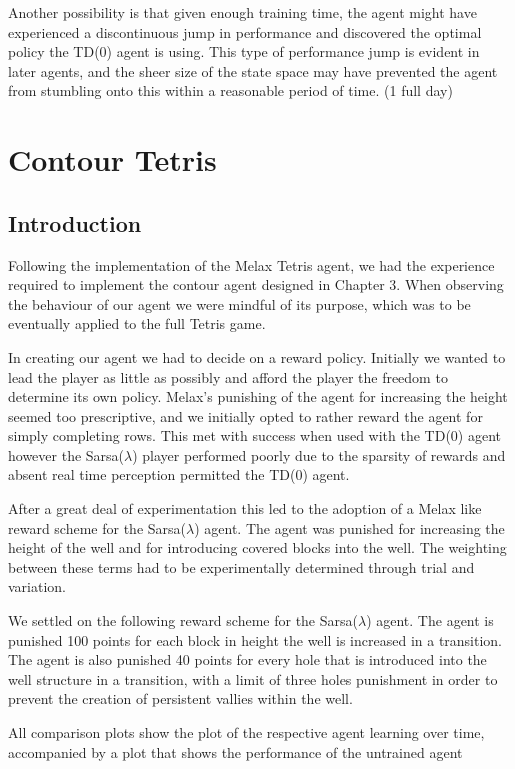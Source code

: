 \documentclass{rucsthesis}
\begin{document}
Another possibility is that given enough training time, the agent might have experienced a discontinuous jump in performance and discovered the optimal policy the TD(0) agent is using. This type of performance jump is evident in later agents, and the sheer size of the state space may have prevented the agent from stumbling onto this within a reasonable period of time. (1 full day)

\chapter{Contour Tetris}

\section{Introduction}

Following the implementation of the Melax Tetris agent, we had the experience required to implement the contour agent designed in Chapter 3. When observing the behaviour of our agent we were mindful of its purpose, which was to be eventually applied to the full Tetris game. 

In creating our agent we had to decide on a reward policy. Initially we wanted to lead the player as little as possibly and afford the player the freedom to determine its own policy. Melax's punishing of the agent for increasing the height seemed too prescriptive, and we initially opted to rather reward the agent for simply completing rows. This met with success when used with the TD(0) agent however the Sarsa($\lambda$) player performed poorly due to the sparsity of rewards and absent real time perception permitted the TD(0) agent.

After a great deal of experimentation this led to the adoption of a Melax like reward scheme for the Sarsa($\lambda$) agent. The agent was punished for increasing the height of the well and for introducing covered blocks into the well. The weighting between these terms had to be experimentally determined through trial and variation.

We settled on the following reward scheme for the Sarsa($\lambda$) agent. The agent is punished 100 points for each block in height the well is increased in a transition. The agent is also punished 40 points for every hole that is introduced into the well structure in a transition, with a limit of three holes punishment in order to prevent the creation of persistent vallies within the well.

All comparison plots show the plot of the respective agent learning over time, accompanied by a plot that shows the performance of the untrained agent
\end{document}
